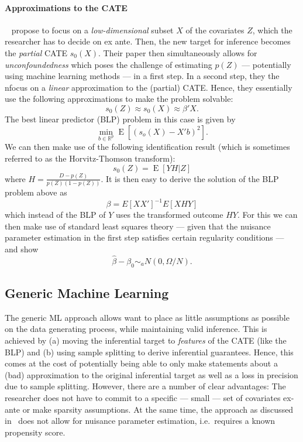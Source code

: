 \documentclass[11pt, a4paper, leqno]{article}
\DeclareMathOperator{\E}{E}
\begin{document}
\paragraph*{Approximations to the CATE}
~\cite{semenova2021debiased} propose to focus on a \textit{low-dimensional} subset $X$ of the covariates $Z$, which the researcher has to decide on ex ante.
Then, the new target for inference becomes the \textit{partial} CATE $s_0(X)$.
Their paper then simultaneously allows for \textit{unconfoundedness} which poses the challenge of estimating $p(Z)$ --- potentially using machine learning methods --- in a first step.
In a second step, they the nfocus on a \textit{linear} approximation to the (partial) CATE\@.
Hence, they essentially use the following approximations to make the problem solvable:
\begin{equation*}
    s_0(Z) \approx s_0(X) \approx \beta'X.
\end{equation*}
The best linear predictor (BLP) problem in this case is given by
\begin{equation*}
    \min_{b\in\mathbb{R}^p} \E [(s_o(X) - X'b)^2].
\end{equation*}
We can then make use of the following identification result (which is sometimes referred to as the Horvitz-Thomson transform):
\begin{equation*}
    s_0(Z) = \E[YH|Z]
\end{equation*}
where $H = \frac{D-p(Z)}{p(Z)(1-p(Z))}$.
It is then easy to derive the solution of the BLP problem above as
\begin{equation*}
    \beta = E[XX']^{-1}E[XHY]
\end{equation*}
which instead of the BLP of $Y$ uses the transformed outcome $HY$.
For this we can then make use of standard least squares theory --- given that the nuisance parameter estimation in the first step satisfies certain regularity conditions --- and show
\begin{equation*}
    \hat{\beta} - \beta_0 \sim_a N(0, \Omega/N).
\end{equation*}

\subsection{Generic Machine Learning}
The generic ML approach allows want to place as little assumptions as possible on the data generating process, while maintaining valid inference.
This is achieved by (a) moving the inferential target to \textit{features} of the CATE (like the BLP) and (b) using sample splitting to derive inferential guarantees.
Hence, this comes at the cost of potentially being able to only make statements about a (bad) approximation to the original inferential target as well as a loss in precision due to sample splitting.
However, there are a number of clear advantages: The researcher does not have to commit to a specific --- small --- set of covariates ex-ante or make sparsity assumptions.
At the same time, the approach as discussed in~\cite{chernozhukov2023genml} does not allow for nuisance parameter estimation, i.e.\ requires a known propensity score.
\end{document}

